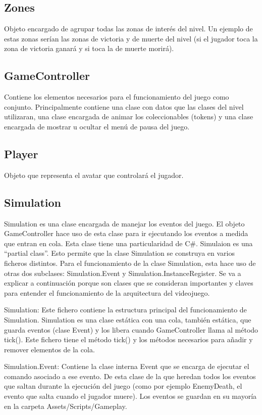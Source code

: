 \subsection{Zones}
Objeto encargado de agrupar todas las zonas de interés del nivel. Un ejemplo de estas zonas serían las zonas de victoria y de muerte del nivel (si el jugador toca la zona de victoria ganará y si toca la de muerte morirá).

\subsection{GameController}
Contiene los elementos necesarios para el funcionamiento del juego como conjunto. Principalmente contiene una clase con datos que las clases del nivel utilizaran, una clase encargada de animar los coleccionables (tokens) y una clase encargada de mostrar u ocultar el menú de pausa del juego.

\subsection{Player}
Objeto que representa el avatar que controlará el jugador.

\subsection{Simulation}
Simulation es una clase encargada de manejar los eventos del juego. El objeto GameController hace uso de esta clase para ir ejecutando los eventos a medida que entran en cola. Esta clase tiene una particularidad de C\#. Simulaion es una “partial class”. Esto permite que la clase Simulation se construya en varios ficheros distintos. Para el funcionamiento de la clase Simulation, esta hace uso de otras dos subclases: Simulation.Event y Simulation.InstanceRegister. Se va a explicar a continuación porque son clases que se consideran importantes y claves para entender el funcionamiento de la arquitectura del videojuego.

Simulation: Este fichero contiene la estructura principal del funcionamiento de Simulation. Simulation es una clase estática con una cola, también estática, que guarda eventos (clase Event) y los libera cuando GameController llama al método tick(). Este fichero tiene el método tick() y los métodos necesarios para añadir y remover elementos de la cola. 

Simulation.Event: Contiene la clase interna Event que se encarga de ejecutar el comando asociado a ese evento. De esta clase de la que heredan todos los eventos que saltan durante la ejecución del juego (como por ejemplo EnemyDeath, el evento que salta cuando el jugador muere). Los eventos se guardan en su mayoría en la carpeta Assets/Scripts/Gameplay.

